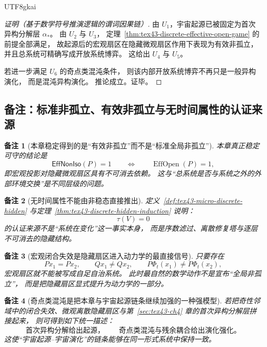 \documentclass[12pt]{article}
\newtheorem{remark}{备注}[section]
\newcommand{\EffOpen}{\operatorname{EffOpen}}
\begin{document}
\begin{CJK*}{UTF8}{gkai}
\begin{proof}[证明（基于数学符号推演逻辑的谓词因果链）]
由 $U_1$，宇宙起源已被固定为首次异构分解层 $\alpha_\ast$。
由 $U_2$ 与 $U_3$，
定理~\ref{thm:tex43-discrete-effective-open-game} 的前提全部满足，
故起源后的宏观扇区在隐藏微观扇区作用下表现为有效非孤立，
并且总系统可精确写成开放系统博弈。
这给出 $U_4$ 与 $U_5$。

若进一步满足 $U_6$ 的奇点类混沌条件，
则该内部开放系统博弈不再只是一般异构演化，
而是混沌异构演化。
推论成立。证毕。
\end{proof}

\subsection{备注：标准非孤立、有效非孤立与无时间属性的认证来源}
\label{subsec:tex43-ch5-remarks}

\begin{remark}[本章稳定得到的是“有效非孤立”而不是“标准全局非孤立”]
本章真正稳定可守的结论是
\[
  \mathsf{EffNonIso}(P)=1
  \qquad\Longleftrightarrow\qquad
  \EffOpen(P)=1,
\]
即宏观投影对隐藏微观扇区具有不可消去依赖。
这与“总系统是否与系统之外的外部环境交换”是不同层级的问题。
\end{remark}

\begin{remark}[无时间属性不能由非稳态直接推出]
定义~\ref{def:tex43-micro-discrete-hidden} 与定理~\ref{thm:tex43-discrete-hidden-induction}
说明：
\[
  \tau(V)=0
\]
的认证来源不是“系统在变化”这一事实本身，
而是序数滤过、离散修复塔与逐层不可消去的隐藏结构。
\end{remark}

\begin{remark}[宏观闭合失效是隐藏扇区进入动力学的最直接信号]
只要存在
\[
  Px_1=Px_2,\qquad Qx_1\neq Qx_2,
\qquad
  P\Phi_t(x_1)\neq P\Phi_t(x_2),
\]
宏观扇区就不能被写成自足自治系统。
此时最自然的数学动作不是宣布“全局非孤立”，
而是把隐藏扇区显式提升为动力学的一部分。
\end{remark}

\begin{remark}[奇点类混沌是把本章与宇宙起源链条继续加强的一种强模型]
若把奇性邻域中的闭合失效、微观离散隐藏扇区与第~\ref{sec:tex43-ch4} 章的首次异构分解层拼接起来，
则可得到如下统一描述：
\[
  \text{首次异构分解给出起源，}
  \qquad
  \text{奇点类混沌与残余耦合给出演化强化。}
\]
这使“宇宙起源--宇宙演化”的链条能够在同一形式系统中保持一致。
\end{remark}

\clearpage


\end{CJK*}
\end{document}
